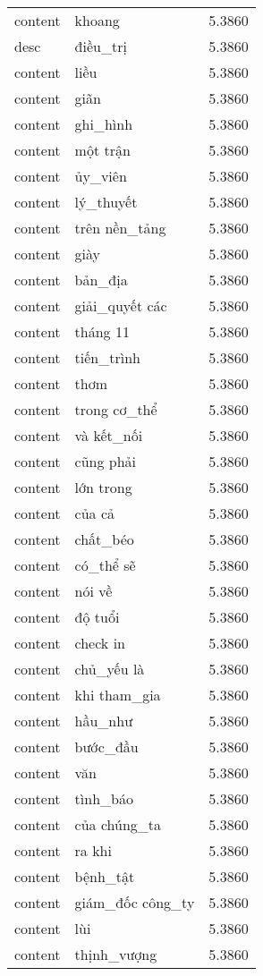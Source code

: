 \documentclass{article}
\begin{document}
\begin{tabular}{lll}
content & khoang & 5.3860\\
desc & điều\_trị & 5.3860\\
content & liều & 5.3860\\
content & giãn & 5.3860\\
content & ghi\_hình & 5.3860\\
content & một trận & 5.3860\\
content & ủy\_viên & 5.3860\\
content & lý\_thuyết & 5.3860\\
content & trên nền\_tảng & 5.3860\\
content & giày & 5.3860\\
content & bản\_địa & 5.3860\\
content & giải\_quyết các & 5.3860\\
content & tháng 11 & 5.3860\\
content & tiến\_trình & 5.3860\\
content & thơm & 5.3860\\
content & trong cơ\_thể & 5.3860\\
content & và kết\_nối & 5.3860\\
content & cũng phải & 5.3860\\
content & lớn trong & 5.3860\\
content & của cả & 5.3860\\
content & chất\_béo & 5.3860\\
content & có\_thể sẽ & 5.3860\\
content & nói về & 5.3860\\
content & độ tuổi & 5.3860\\
content & check in & 5.3860\\
content & chủ\_yếu là & 5.3860\\
content & khi tham\_gia & 5.3860\\
content & hầu\_như & 5.3860\\
content & bước\_đầu & 5.3860\\
content & văn & 5.3860\\
content & tình\_báo & 5.3860\\
content & của chúng\_ta & 5.3860\\
content & ra khi & 5.3860\\
content & bệnh\_tật & 5.3860\\
content & giám\_đốc công\_ty & 5.3860\\
content & lùi & 5.3860\\
content & thịnh\_vượng & 5.3860\\

\end{tabular}
\end{document}
